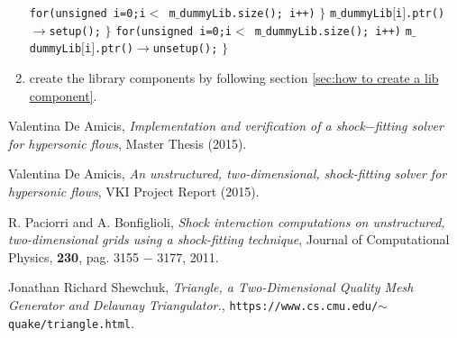 \documentclass[11pt,a4paper,oneside]{article}
\begin{document}
\begin{enumerate}
{\newline
\newline
\hspace*{1cm} \texttt{for(unsigned i=0;i$<$ m$\_$dummyLib.size(); i++)} $\}$
\newline
\hspace*{2cm} \texttt{m$\_$dummyLib$[$i$]$.ptr()$\to$setup();}
\newline
\hspace*{1cm} $\}$
\newline
\newline
\hspace*{1cm}\texttt{for(unsigned i=0;i$<$ m$\_$dummyLib.size(); i++)} 
\newline
\hspace*{2cm} \texttt{m$\_$dummyLib$[$i$]$.ptr()$\to$unsetup();}
\newline
\hspace*{1cm} $\}$
}
\item{create the library components by following section \ref{sec:how to create a lib component}.}
\end{enumerate}

\begin{thebibliography}{9}

Valentina De Amicis,
\emph{Implementation and verification of a shock$-$fitting solver for hypersonic flows},
Master Thesis (2015).

Valentina De Amicis,
\emph{An unstructured, two-dimensional, shock-fitting solver for hypersonic flows},
VKI Project Report (2015).

R. Paciorri and A. Bonfiglioli,
\emph{Shock interaction computations on unstructured, two-dimensional grids using a shock-fitting technique},
Journal of Computational Physics, \textbf{230}, pag. 3155 $-$ 3177, 2011.

 Jonathan Richard Shewchuk,
 \emph{Triangle, a Two-Dimensional Quality Mesh Generator and Delaunay Triangulator.},
 \texttt{https://www.cs.cmu.edu/$\sim$quake/triangle.html}.
 
\end{thebibliography}
\end{document}
